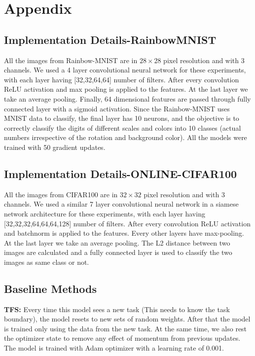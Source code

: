 \newpage

\section{Appendix}

\subsection{Implementation Details-RainbowMNIST}
\label{sec:A1}
All the images from Rainbow-MNIST are in $28 \times 28$ pixel resolution and with 3 channels. We used a 4 layer convolutional neural network for these experiments, with each layer having [32,32,64,64] number of filters. After every convolution ReLU activation and max pooling is applied to the features. At the last layer we take an average pooling. Finally, 64 dimensional features are passed through fully connected layer with a sigmoid activation. Since the Rainbow-MNIST uses MNIST data to classify, the final layer has 10 neurons, and the objective is to correctly classify the digits of different scales and colors into 10 classes (actual numbers irrespective of the rotation and background color). All the models were trained with 50 gradient updates.

\vspace{-0.4cm}
\subsection{Implementation Details-ONLINE-CIFAR100}
\vspace{-0.2cm}
\label{sec:A2}
All the images from CIFAR100 are in $32 \times 32$ pixel resolution and with 3 channels. We used a similar 7 layer convolutional neural network in a siamese network architecture for these experiments, with each layer having [32,32,32,64,64,64,128] number of filters. After every convolution ReLU activation and batchnorm is applied to the features. Every other layers have max-pooling. At the last layer we take an average pooling. The L2 distance between two images are calculated and a fully connected layer is used to classify the two images as same class or not.

\vspace{-0.4cm}
\subsection{Baseline Methods}
\vspace{-0.2cm}
\label{sec:A3}
\textbf{TFS:} Every time this model sees a new task (This needs to know the task boundary), the model resets to new sets of random weights. After that the model is trained only using the data from the new task. At the same time, we also rest the optimizer state to remove any effect of momentum from previous updates. The model is trained with Adam optimizer with a learning rate of 0.001. 

